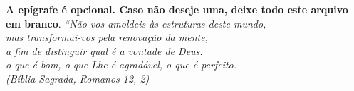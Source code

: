 \begin{epigrafe}
\vspace*{\fill}
\begin{flushright}
\textbf{A epígrafe é opcional. Caso não deseje uma, deixe todo
este arquivo em branco}.
\textit{``Não vos amoldeis às estruturas deste mundo, \\
mas transformai-vos pela renovação da mente, \\
a fim de distinguir qual é a vontade de Deus: \\
o que é bom, o que Lhe é agradável, o que é perfeito.\\
(Bíblia Sagrada, Romanos 12, 2)}
\end{flushright}
\end{epigrafe}